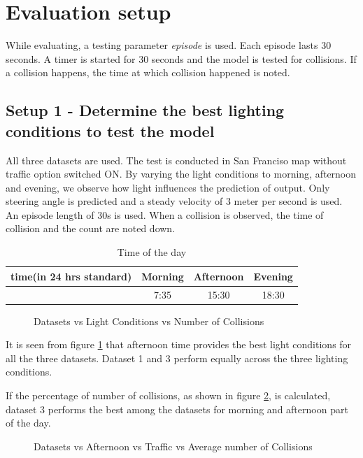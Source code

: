 \section{Evaluation setup}
While evaluating, a testing parameter \textit{episode} is used. Each episode lasts 30 seconds. A timer is started for 30 seconds and
the  model is tested for collisions. If a collision happens, the time at which collision
happened is noted.

\subsection{Setup 1 - Determine the best lighting conditions to test the model}
\label{chapter05subsec:setup1}
All three datasets are used. The test is conducted in San Franciso map without traffic
option switched ON. By varying the light conditions to morning, afternoon and evening, we
observe how light influences the prediction of output. Only steering angle is predicted
and a steady velocity of 3 meter per second is used. An episode length of 30s is used.
When a collision is observed, the time of collision and the count are noted down.
\begin{table}[t]
    \centering
\begin{tabular}{|c c c c|}
    \hline
    time(in 24 hrs standard) & Morning & Afternoon & Evening \\\hline
      & 7:35 & 15:30 & 18:30 \\\hline
\end{tabular}
\caption{Time of the day}
\label{table:timeoftheday}
\end{table}

\begin{figure}
	\centering
    \def\svgwidth{0.6\textwidth}
    \caption{Datasets vs Light Conditions vs Number of Collisions}
    \label{fig:dsvslcvsncolsetup1}
\end{figure}

It is seen from figure \ref{fig:dsvslcvsncolsetup1} that afternoon time provides the best light conditions for all the three
datasets. Dataset 1 and 3 perform equally across the three lighting conditions.

If the percentage of number of collisions, as shown in figure
\ref{fig:dsvslcvstrafficavgncolsetup1a}, is calculated, dataset 3 performs the best among
the datasets for morning and afternoon part of the day.
\begin{figure}
	\centering
    \def\svgwidth{0.6\textwidth}
    \caption{Datasets vs Afternoon vs Traffic vs Average number of Collisions}
    \label{fig:dsvslcvstrafficavgncolsetup1a}
\end{figure}

